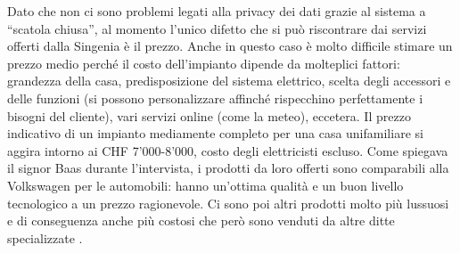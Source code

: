 Dato che non ci sono problemi legati alla privacy dei dati grazie al sistema a “scatola chiusa”, al momento l’unico difetto che si può riscontrare dai servizi offerti dalla Singenia è il prezzo. Anche in questo caso è molto difficile stimare un prezzo medio perché il costo dell’impianto dipende da molteplici fattori: grandezza della casa, predisposizione del sistema elettrico, scelta degli accessori e delle funzioni (si possono personalizzare affinché rispecchino perfettamente i bisogni del cliente), vari servizi online (come la meteo), eccetera.
Il prezzo indicativo di un impianto mediamente completo per una casa unifamiliare si aggira intorno ai CHF 7’000-8'000, costo degli elettricisti escluso. Come spiegava il signor Baas durante l’intervista, i prodotti da loro offerti sono comparabili alla Volkswagen per le automobili: hanno un’ottima qualità e un buon livello tecnologico a un prezzo ragionevole. Ci sono poi altri prodotti molto più lussuosi e di conseguenza anche più costosi che però sono venduti da altre ditte specializzate .

